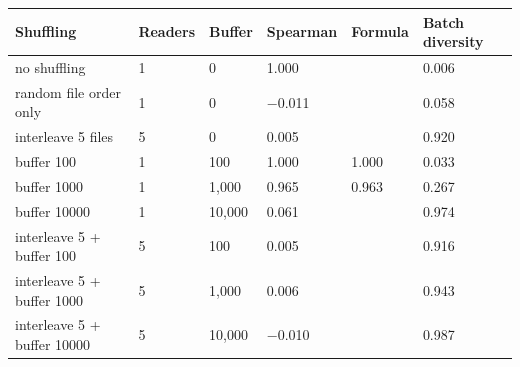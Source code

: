 \begin{tabular}{L{4.4cm}R{1.4cm}R{1.4cm}R{1.8cm}R{1.8cm}R{2.4cm}}
\toprule
Shuffling & Readers & Buffer & Spearman & Formula & Batch diversity \\
\midrule
no shuffling & 1 & 0 & 1.000 &  & 0.006 \\
random file order only & 1 & 0 & $-$0.011 &  & 0.058 \\
interleave 5 files & 5 & 0 & 0.005 &  & 0.920 \\
buffer 100 & 1 & 100 & 1.000 & 1.000 & 0.033 \\
buffer 1000 & 1 & 1,000 & 0.965 & 0.963 & 0.267 \\
buffer 10000 & 1 & 10,000 & 0.061 &  & 0.974 \\
interleave 5 + buffer 100 & 5 & 100 & 0.005 &  & 0.916 \\
interleave 5 + buffer 1000 & 5 & 1,000 & 0.006 &  & 0.943 \\
interleave 5 + buffer 10000 & 5 & 10,000 & $-$0.010 &  & 0.987 \\
\bottomrule
\end{tabular}
